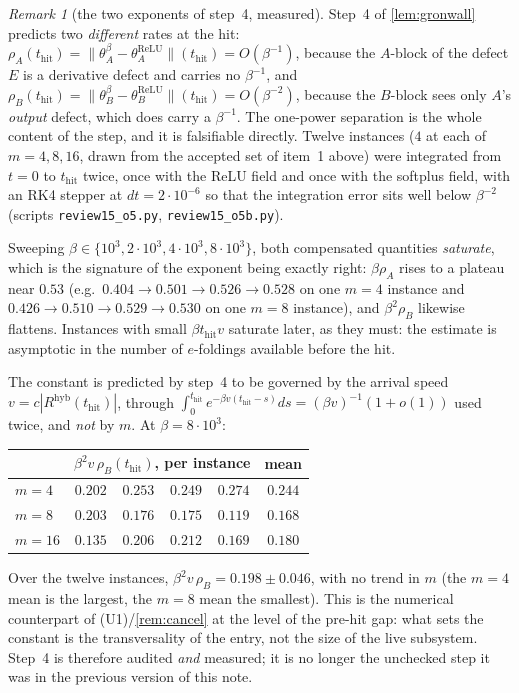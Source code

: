 \documentclass[11pt]{article}
\theoremstyle{definition}
\theoremstyle{remark}
\newtheorem{remark}{Remark}
\newcommand{\hyb}{\mathrm{hyb}}
\newcommand{\thit}{t_{\mathrm{hit}}}
\begin{document}
\begin{remark}[the two exponents of step~4, measured]\label{rem:o5num}
Step~4 of \cref{lem:gronwall} predicts two \emph{different} rates at the hit:
$\rho_A(\thit)=\|\theta_A^\beta-\theta_A^{\mathrm{ReLU}}\|(\thit)=O(\beta^{-1})$,
because the $A$-block of the defect $E$ is a derivative defect and carries no
$\beta^{-1}$, and
$\rho_B(\thit)=\|\theta_B^\beta-\theta_B^{\mathrm{ReLU}}\|(\thit)=O(\beta^{-2})$,
because the $B$-block sees only $A$'s \emph{output} defect, which does carry a
$\beta^{-1}$. The one-power separation is the whole content of the step, and it
is falsifiable directly. Twelve instances ($4$ at each of $m=4,8,16$, drawn from
the accepted set of item~1 above) were integrated from $t=0$ to $\thit$ twice,
once with the ReLU field and once with the softplus field, with an RK4 stepper at
$dt=2\cdot10^{-6}$ so that the integration error sits well below $\beta^{-2}$
(scripts \texttt{review15\_o5.py}, \texttt{review15\_o5b.py}).

Sweeping $\beta\in\{10^3,2\cdot10^3,4\cdot10^3,8\cdot10^3\}$, both compensated
quantities \emph{saturate}, which is the signature of the exponent being exactly
right: $\beta\rho_A$ rises to a plateau near $0.53$ (e.g.\ $0.404\to0.501\to
0.526\to0.528$ on one $m=4$ instance and $0.426\to0.510\to0.529\to0.530$ on one
$m=8$ instance), and $\beta^2\rho_B$ likewise flattens. Instances with small
$\beta\thit v$ saturate later, as they must: the estimate is asymptotic in the
number of $e$-foldings available before the hit.

The constant is predicted by step~4 to be governed by the arrival speed
$v=c|R^{\hyb}(\thit)|$, through
$\int_0^{\thit}e^{-\beta v(\thit-s)}ds=(\beta v)^{-1}(1+o(1))$ used twice, and
\emph{not} by $m$. At $\beta=8\cdot10^3$:
\begin{center}
\small
\begin{tabular}{lcccc|c}
\hline
& \multicolumn{4}{c|}{$\beta^2 v\,\rho_B(\thit)$, per instance} & mean\\
\hline
$m=4$ & $0.202$ & $0.253$ & $0.249$ & $0.274$ & $0.244$\\
$m=8$ & $0.203$ & $0.176$ & $0.175$ & $0.119$ & $0.168$\\
$m=16$ & $0.135$ & $0.206$ & $0.212$ & $0.169$ & $0.180$\\
\hline
\end{tabular}
\end{center}
\noindent Over the twelve instances, $\beta^2v\,\rho_B=0.198\pm0.046$, with no
trend in $m$ (the $m=4$ mean is the largest, the $m=8$ mean the smallest). This
is the numerical counterpart of (U1)/\cref{rem:cancel} at the level of the
pre-hit gap: what sets the constant is the transversality of the entry, not the
size of the live subsystem. Step~4 is therefore audited \emph{and} measured; it
is no longer the unchecked step it was in the previous version of this note.
\end{remark}
\end{document}
